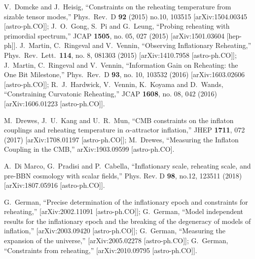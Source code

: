 \documentclass[%
aps,prd,nofootinbib,showkeys,a4paper,10pt
]{revtex4-2}
\begin{document}
\begin{thebibliography}{10}
V.~Domcke and J.~Heisig,
``Constraints on the reheating temperature from sizable tensor modes,''
Phys.\ Rev.\ D {\bf 92} (2015) no.10,  103515
[arXiv:1504.00345 [astro-ph.CO]];
J.~O.~Gong, S.~Pi and G.~Leung,
``Probing reheating with primordial spectrum,''
JCAP {\bf 1505}, no. 05, 027 (2015)
[arXiv:1501.03604 [hep-ph]].
J.~Martin, C.~Ringeval and V.~Vennin,
``Observing Inflationary Reheating,''
Phys.\ Rev.\ Lett.\  {\bf 114}, no. 8, 081303 (2015)
[arXiv:1410.7958 [astro-ph.CO]];
J.~Martin, C.~Ringeval and V.~Vennin,
``Information Gain on Reheating: the One Bit Milestone,''
Phys.\ Rev.\ D {\bf 93}, no. 10, 103532 (2016)
[arXiv:1603.02606 [astro-ph.CO]];
R.~J.~Hardwick, V.~Vennin, K.~Koyama and D.~Wands,
``Constraining Curvatonic Reheating,''
JCAP {\bf 1608}, no. 08, 042 (2016)
[arXiv:1606.01223 [astro-ph.CO]].



M.~Drewes, J.~U.~Kang and U.~R.~Mun,
``CMB constraints on the inflaton couplings and reheating temperature in $\alpha$-attractor inflation,''
JHEP {\bf 1711}, 072 (2017)
[arXiv:1708.01197 [astro-ph.CO]];
M.~Drewes,
``Measuring the Inflaton Coupling in the CMB,''
arXiv:1903.09599 [astro-ph.CO].



A.~Di Marco, G.~Pradisi and P.~Cabella,
``Inflationary scale, reheating scale, and pre-BBN cosmology with scalar fields,''
Phys. Rev. D \textbf{98}, no.12, 123511 (2018)
[arXiv:1807.05916 [astro-ph.CO]].


G.~German,
``Precise determination of the inflationary epoch and constraints for reheating,''
[arXiv:2002.11091 [astro-ph.CO]];
G.~German,
``Model independent results for the inflationary epoch and the breaking of the degeneracy of models of inflation,''
[arXiv:2003.09420 [astro-ph.CO]];
G.~German,
``Measuring the expansion of the universe,''
[arXiv:2005.02278 [astro-ph.CO]];
G.~German,
``Constraints from reheating,''
[arXiv:2010.09795 [astro-ph.CO]].



\end{thebibliography}
\end{document}
